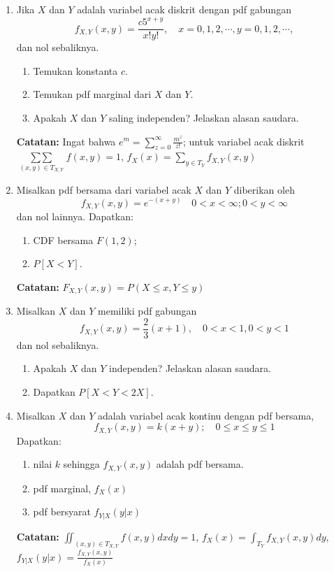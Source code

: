\documentclass[12pt,a4paper]{article}
\begin{document}
\begin{enumerate}
  \item Jika $X$ dan $Y$ adalah variabel acak diskrit dengan pdf gabungan
        \[ f_{X,Y}(x,y) = \frac{c5^{x+y}}{x!y!}, \quad x=0,1,2,\cdots, y=0,1,2,\cdots, \]
        dan nol sebaliknya.
        \begin{enumerate}[label=(\alph*)]
          \item Temukan konstanta $c$.
          \item Temukan pdf marginal dari $X$ dan $Y$.
          \item Apakah $X$ dan $Y$ saling independen? Jelaskan alasan saudara.
        \end{enumerate}
        \textbf{Catatan:} Ingat bahwa $e^m = \sum_{z=0}^{\infty} \frac{m^z}{z!}$; untuk variabel acak diskrit $\mathop{\sum\!\sum}\limits_{(x,y)\in T_{X,Y}} f(x,y) = 1$, $f_X(x) = \sum_{y\in T_Y} f_{X,Y}(x,y)$

  \item Misalkan pdf bersama dari variabel acak $X$ dan $Y$ diberikan oleh
        \[ f_{X,Y}(x,y) = e^{-(x+y)} \quad 0 < x < \infty; 0 < y < \infty \]
        dan nol lainnya. Dapatkan:
        \begin{enumerate}[label=(\alph*)]
          \item CDF bersama $F(1,2)$;
          \item $P[X < Y]$.
        \end{enumerate}
        \textbf{Catatan:} $F_{X,Y}(x,y) = P(X \le x, Y \le y)$

  \item Misalkan $X$ dan $Y$ memiliki pdf gabungan
        \[ f_{X,Y}(x,y) = \frac{2}{3}(x+1), \quad 0 < x < 1, 0 < y < 1 \]
        dan nol sebaliknya.
        \begin{enumerate}[label=(\alph*)]
          \item Apakah $X$ dan $Y$ independen? Jelaskan alasan saudara.
          \item Dapatkan $P[X < Y < 2X]$.
        \end{enumerate}

  \item Misalkan $X$ dan $Y$ adalah variabel acak kontinu dengan pdf bersama,
        \[ f_{X,Y}(x,y) = k(x+y); \quad 0 \le x \le y \le 1 \]
        Dapatkan:
        \begin{enumerate}[label=(\alph*)]
          \item nilai $k$ sehingga $f_{X,Y}(x,y)$ adalah pdf bersama.
          \item pdf marginal, $f_X(x)$
          \item pdf bersyarat $f_{Y|X}(y|x)$
        \end{enumerate}
        \textbf{Catatan:} $\iint_{(x,y)\in T_{X,Y}} f(x,y) dx dy = 1$, $f_X(x) = \int_{T_Y} f_{X,Y}(x,y)dy$, $f_{Y|X}(y|x) = \frac{f_{X,Y}(x,y)}{f_X(x)}$
\end{enumerate}
\end{document}
